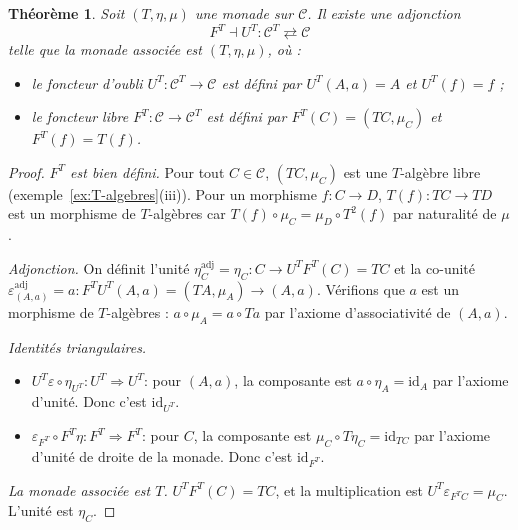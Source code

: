 \documentclass[a4paper,12pt]{book}
\newcommand{\id}{\mathrm{id}}
\newtheorem{theoreme}{Théorème}[chapter]
\begin{document}
\begin{theoreme}\label{thm:adjonction-EM}
Soit $(T, \eta, \mu)$ une monade sur $\mathcal{C}$.
Il existe une adjonction
\[
    F^T \dashv U^T \colon \mathcal{C}^T \rightleftarrows \mathcal{C}
\]
telle que la monade associée est $(T, \eta, \mu)$, où :
\begin{itemize}
    \item le foncteur d'oubli $U^T \colon \mathcal{C}^T \to \mathcal{C}$
    est défini par $U^T(A, a) = A$ et $U^T(f) = f$ ;
    \item le foncteur libre $F^T \colon \mathcal{C} \to \mathcal{C}^T$
    est défini par $F^T(C) = (TC, \mu_C)$ et
    $F^T(f) = T(f)$.
\end{itemize}
\end{theoreme}

\begin{proof}
\emph{$F^T$ est bien défini.}
Pour tout $C \in \mathcal{C}$, $(TC, \mu_C)$ est une $T$-algèbre
libre (exemple~\ref{ex:T-algebres}(iii)).
Pour un morphisme $f \colon C \to D$, $T(f) \colon TC \to TD$ est
un morphisme de $T$-algèbres car
$T(f) \circ \mu_C = \mu_D \circ T^2(f)$ par naturalité de $\mu$.

\emph{Adjonction.}
On définit l'unité $\eta^{\mathrm{adj}}_C = \eta_C \colon C \to U^T F^T(C) = TC$
et la co-unité $\varepsilon^{\mathrm{adj}}_{(A,a)} = a \colon F^T U^T(A,a)
= (TA, \mu_A) \to (A,a)$.
Vérifions que $a$ est un morphisme de $T$-algèbres :
$a \circ \mu_A = a \circ Ta$ par l'axiome d'associativité de $(A,a)$.

\emph{Identités triangulaires.}
\begin{itemize}
    \item $U^T \varepsilon \circ \eta_{U^T} \colon U^T \Rightarrow U^T$:
    pour $(A,a)$, la composante est $a \circ \eta_A = \id_A$
    par l'axiome d'unité. Donc c'est $\id_{U^T}$.

    \item $\varepsilon_{F^T} \circ F^T\eta \colon F^T \Rightarrow F^T$:
    pour $C$, la composante est $\mu_C \circ T\eta_C = \id_{TC}$
    par l'axiome d'unité de droite de la monade. Donc c'est $\id_{F^T}$.
\end{itemize}

\emph{La monade associée est $T$.}
$U^T F^T(C) = TC$, et la multiplication est
$U^T \varepsilon_{F^T C} = \mu_C$. L'unité est $\eta_C$.
\end{proof}
\end{document}
